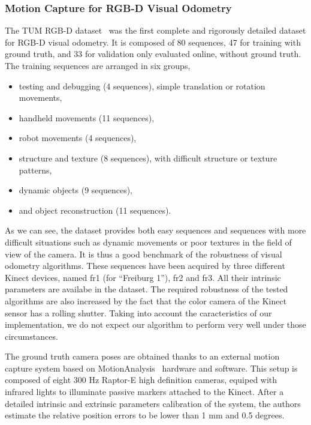 \subsubsection{Motion Capture for RGB-D Visual Odometry}%
\label{ssub:motion_capture}

The TUM RGB-D dataset~\cite{sturm2012benchmark} was the first
complete and rigorously detailed dataset for RGB-D visual odometry.
It is composed of 80 sequences, 47 for training with ground truth,
and 33 for validation only evaluated online, without ground truth.
The training sequences are arranged in six groups,
\begin{itemize}
\setlength\itemsep{-0.5em}
	\item testing and debugging (4 sequences), simple translation or rotation movements,
	\item handheld movements (11 sequences),
	\item robot movements (4 sequences),
	\item structure and texture (8 sequences), with difficult structure or texture patterns,
	\item dynamic objects (9 sequences),
	\item and object reconstruction (11 sequences).
\end{itemize}
As we can see, the dataset provides both easy sequences and sequences with
more difficult situations such as dynamic movements or poor textures
in the field of view of the camera.
It is thus a good benchmark of the robustness of visual odometry algorithms.
These sequences have been acquired by three different Kinect devices,
named fr1 (for ``Freiburg 1''), fr2 and fr3.
All their intrinsic parameters are availabe in the dataset.
The required robustness of the tested algorithms are also increased by the fact that
the color camera of the Kinect sensor has a rolling shutter.
Taking into account the caracteristics of our implementation,
we do not expect our algorithm to perform very well under those circumstances.

The ground truth camera poses are obtained thanks to an external motion capture system
based on MotionAnalysis~\cite{MotionAnalysis} hardware and software.
This setup is composed of eight 300 Hz Raptor-E high definition cameras,
equiped with infrared lights to illuminate passive markers attached to the Kinect.
After a detailed intrinsic and extrinsic parameters calibration of the system,
the authors estimate the relative position errors to be lower than 1 mm and 0.5 degrees.

